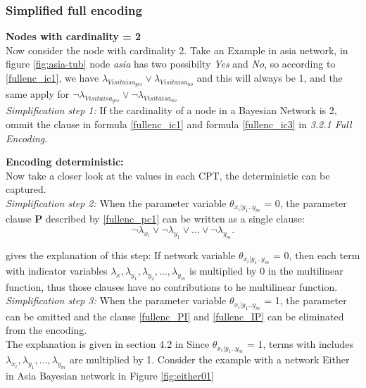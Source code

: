         \subsubsection{Simplified full encoding}
        \textbf{Nodes with cardinality = 2}\\
        Now consider the node with cardinality 2. Take an Example in asia network, in figure \ref{fig:asia-tub} node \textit{asia} has two possibilty \textit{Yes} and \textit{No}, so according to \ref{fullenc_ic1}, we have $\lambda_{Visitaisa_{yes}} \vee \lambda_{Visitaisa_{no}}$ and this will always be 1, and the same apply for $\neg\lambda_{Visitaisa_{yes}} \vee \neg\lambda_{Visitaisa_{no}}$ \\
        \newline
        \noindent \textit{Simplification step 1:} If the cardinality of a node in a Bayesian Network is 2, ommit the clause in formula \ref{fullenc_ic1} and formula \ref{fullenc_ic3} in \textit{3.2.1 Full Encoding}.
        \newline
        
        \noindent \textbf{Encoding deterministic:}\\
        Now take a closer look at the values in each CPT, the deterministic can be captured.\\
        
        \noindent \textit{Simplification step 2:} When the parameter variable $\theta_{x_{i}|y_{1}..y_{m}}$ = 0, the parameter clause \textbf{P} described by \ref{fullenc_pc1} can be written as a single clause: $$\neg\lambda_{x_{i}} \vee \neg\lambda_{y_{1}} \vee... \vee \neg\lambda_{y_{m}}.$$
        
        \noindent \cite{enc1} gives the explanation of this step: If network variable $\theta_{x_{i}|y_{1}..y_{m}}$ = 0, then each term with indicator variables $\lambda_{x}, \lambda_{y_{1}}, \lambda_{y_{2}}, ..., \lambda_{y_{m}}$ is multiplied by 0 in the multi\-linear function, thus those clauses have no contributions to he multi\-linear function.\\
        \newline
        \noindent \textit{Simplification step 3:} When the parameter variable $\theta_{x_{i}|y_{1}..y_{m}}$ = 1, the parameter can be omitted and the clause \ref{fullenc_PI} and \ref{fullenc_IP} can be eliminated from the encoding.\\
        
        \noindent The explanation is given in section 4.2 in \cite{enc1} 
        Since $\theta_{x_{i}|y_{1}..y_{m}}$ = 1, terms with includes $\lambda_{x_{i}}, \lambda_{y_{1}}, ..., \lambda_{y_{m}}$ are multiplied by 1. 
        Consider the example with a network Either in Asia Bayesian network in Figure \ref{fig:either01}
        
